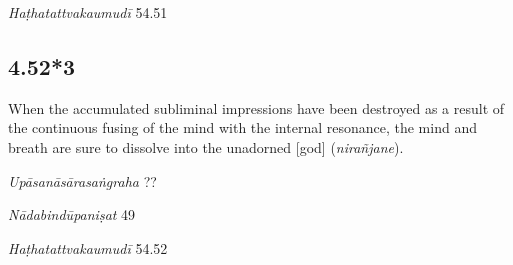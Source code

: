 \begin{ekdosis}

\begin{testimonia}[hp04_052_2]
\emph{Haṭhatattvakaumudī} 54.51
\begin{versinnote}
\end{versinnote}
\end{testimonia}


\subsection*{4.52*3}
\begin{translation}[hp04_052_3]
When the accumulated subliminal impressions have been destroyed as a result of the continuous fusing of the mind with the internal resonance, the mind and breath are sure to dissolve into the unadorned [god] (\emph{nirañjane}).
\end{translation}


\begin{testimonia}[hp04_052_3]
\emph{Upāsanāsārasaṅgraha} ??
\begin{versinnote}
\end{versinnote}

\emph{Nādabindūpaniṣat} 49
\begin{versinnote}
\end{versinnote}

\emph{Haṭhatattvakaumudī} 54.52
\begin{versinnote}
\end{versinnote}
\end{testimonia}


\end{ekdosis}
